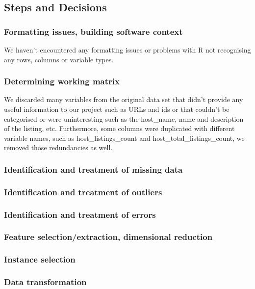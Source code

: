 
\subsection{Steps and Decisions}%
\label{sub:steps-decisions}

\subsubsection{Formatting issues, building software context}
We haven't encountered any formatting issues or problems with R
not recognising any rows, columns or variable types.

\subsubsection{Determining working matrix}
We discarded many variables from the original data set that didn't 
provide any useful information to our project such as URLs and ids or that couldn't be 
categorised or were uninteresting such as the host\_name, name 
and description of the listing, etc. Furthermore, some columns were duplicated with
different variable names, such as host\_listings\_count and 
host\_total\_listings\_count, we removed those redundancies as well.

\subsubsection{Identification and treatment of missing data}
\subsubsection{Identification and treatment of outliers}
\subsubsection{Identification and treatment of errors}
\subsubsection{Feature selection/extraction, dimensional reduction}
\subsubsection{Instance selection}
\subsubsection{Data transformation}
